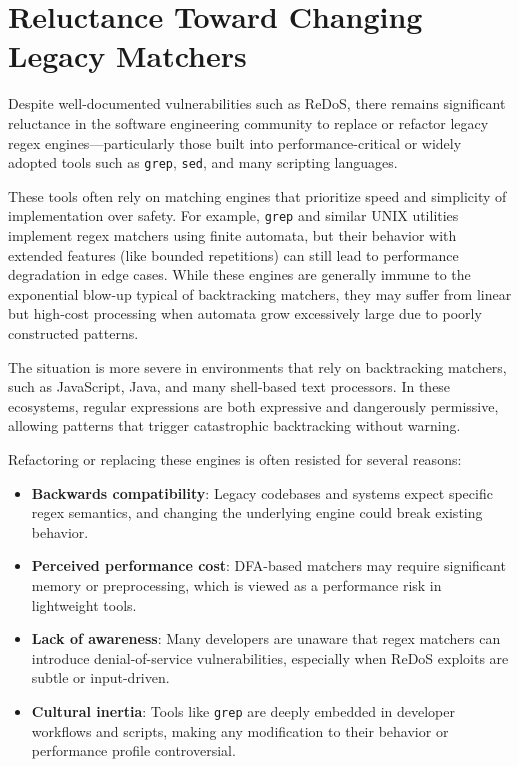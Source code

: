 \section{Reluctance Toward Changing Legacy Matchers}

Despite well-documented vulnerabilities such as ReDoS, there remains significant reluctance in the software engineering community to replace or refactor legacy regex engines—particularly those built into performance-critical or widely adopted tools such as \texttt{grep}, \texttt{sed}, and many scripting languages.

These tools often rely on matching engines that prioritize speed and simplicity of implementation over safety. For example, \texttt{grep} and similar UNIX utilities implement regex matchers using finite automata, but their behavior with extended features (like bounded repetitions) can still lead to performance degradation in edge cases. While these engines are generally immune to the exponential blow-up typical of backtracking matchers, they may suffer from linear but high-cost processing when automata grow excessively large due to poorly constructed patterns.

The situation is more severe in environments that rely on backtracking matchers, such as JavaScript, Java, and many shell-based text processors. In these ecosystems, regular expressions are both expressive and dangerously permissive, allowing patterns that trigger catastrophic backtracking without warning.

Refactoring or replacing these engines is often resisted for several reasons:
\begin{itemize}
	\item \textbf{Backwards compatibility}: Legacy codebases and systems expect specific regex semantics, and changing the underlying engine could break existing behavior.
	\item \textbf{Perceived performance cost}: DFA-based matchers may require significant memory or preprocessing, which is viewed as a performance risk in lightweight tools.
	\item \textbf{Lack of awareness}: Many developers are unaware that regex matchers can introduce denial-of-service vulnerabilities, especially when ReDoS exploits are subtle or input-driven.
	\item \textbf{Cultural inertia}: Tools like \texttt{grep} are deeply embedded in developer workflows and scripts, making any modification to their behavior or performance profile controversial.
\end{itemize}

